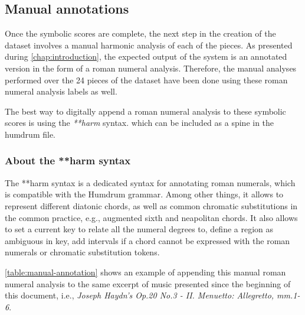 \subsection{Manual annotations}
Once the symbolic scores are complete, the next step in the creation of the dataset involves a manual harmonic analysis of each of the pieces. As presented during \autoref{chap:introduction}, the expected output of the system is an annotated version in the form of a roman numeral analysis. Therefore, the manual analyses performed over the 24 pieces of the dataset have been done using these roman numeral analysis labels as well.

The best way to digitally append a roman numeral analysis to these symbolic scores is using the \emph{**harm} \cite{harm} syntax. which can be included as a spine in the humdrum file.

\subsubsection{About the **harm syntax}
The **harm syntax is a dedicated syntax for annotating roman numerals, which is compatible with the Humdrum grammar. Among other things, it allows to represent different diatonic chords, as well as common chromatic substitutions in the common practice, e.g., augmented sixth and neapolitan chords. It also allows to set a current key to relate all the numeral degrees to, define a region as ambiguous in key, add intervals if a chord cannot be expressed with the roman numerals or chromatic substitution tokens.

\autoref{table:manual-annotation} shows an example of appending this manual roman numeral analysis to the same excerpt of music presented since the beginning of this document, i.e., \emph{Joseph Haydn's Op.20 No.3 - II. Menuetto: Allegretto, mm.1-6}.

